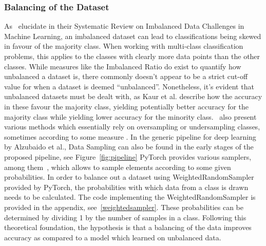 \subsubsection{Balancing of the Dataset}\label{balancingtheory}
As~\citeauthor{kaurbalancing} elucidate in their Systematic Review on Imbalanced Data Challenges
in Machine Learning, an imbalanced dataset can lead to classifications being skewed in favour of the majority class. When working with multi-class classification problems, this applies to the classes with clearly more data points than the other classes. While measures like the Imbalanced Ratio \citep{kulkarni2020foundations} do exist to quantify how unbalanced a dataset is, there commonly doesn't appear to be a strict cut-off value for when a dataset is deemed ``unbalanced''. Nonetheless, it's evident that unbalanced datasets must be dealt with, as Kaur et al\@. describe how the accuracy in these favour the majority class, yielding potentially better accuracy for the majority class while yielding lower accuracy for the minority class.~\citeauthor{kaurbalancing} also present various methods which essentially rely on oversampling or undersampling classes, sometimes according to some measure \citep{kulkarni2020foundations}. In the generic pipeline for deep learning by Alzubaido et al., Data Sampling can also be found in the early stages of the proposed pipeline, see Figure~\ref{fig:pipeline} PyTorch provides various samplers, among them~\cite{pytorchTorchutilsdatax2014}, which allows to sample elements according to some given probabilities. In order to balance out a dataset using WeightedRandomSampler provided by PyTorch, the probabilities with which data from a class is drawn needs to be calculated. The code implementing the WeightedRandomSampler is provided in the appendix, see~\ref{weightedsampler}. These probabilities can be determined by dividing 1 by the number of samples in a class. Following this theoretical foundation, the hypothesis is that a balancing of the data improves accuracy as compared to a model which learned on unbalanced data.

